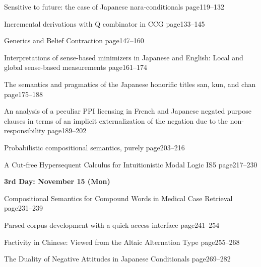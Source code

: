 \documentclass[12pt]{jarticle}
\begin{document}

  
     {Sensitive to future: the case of Japanese nara-conditionals}
     {page119--132}
  
     {Incremental derivations with Q combinator in CCG}
     {page133--145}
  
     {Generics and Belief Contraction}
     {page147--160}




  
     {Interpretations of sense-based minimizers in Japanese and English: Local and global sense-based measurements}
     {page161--174}
  
     {The semantics and pragmatics of the Japanese honorific titles san, kun, and chan}
     {page175--188}
  
     {An analysis of a peculiar PPI licensing in French and Japanese negated purpose clauses in terms of an implicit externalization of the negation due to the non-responsibility}
     {page189--202}




  
     {Probabilistic compositional semantics, purely}
     {page203--216}
  
  
     {A Cut-free Hypersequent Calculus for Intuitionistic Modal Logic IS5}
     {page217--230}




\noindent\textbf{\large 
3rd Day: November 15 (Mon)
}\\




  
     {Compositional Semantics for Compound Words in Medical Case Retrieval}
     {page231--239}
  
     {Parsed corpus development with a quick access interface}
     {page241--254}
  
     {Factivity in Chinese: Viewed from the Altaic Alternation Type}
     {page255--268}

  


  
     {The Duality of Negative Attitudes in Japanese Conditionals}
     {page269--282}
  
\end{document}
